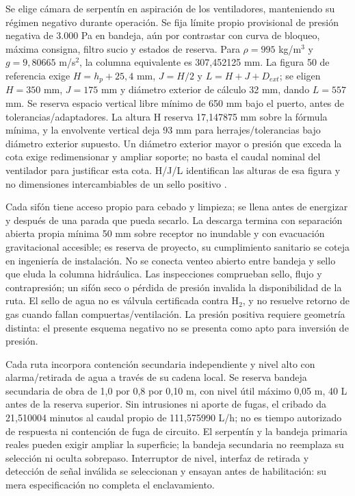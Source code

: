 Se elige cámara de serpentín en aspiración de los ventiladores, manteniendo su régimen negativo durante operación. Se fija límite propio provisional de presión negativa de 3.000 Pa en bandeja, aún por contrastar con curva de bloqueo, máxima consigna, filtro sucio y estados de reserva. Para $\rho=995$ kg/m$^3$ y $g=9,80665$ m/s$^2$, la columna equivalente es 307,452125 mm. La figura 50 de referencia exige $H=h_p+25,4$ mm, $J=H/2$ y $L=H+J+D_{ext}$; se eligen $H=350$ mm, $J=175$ mm y diámetro exterior de cálculo 32 mm, dando $L=557$ mm. Se reserva espacio vertical libre mínimo de 650 mm bajo el puerto, antes de tolerancias/adaptadores. La altura H reserva 17,147875 mm sobre la fórmula mínima, y la envolvente vertical deja 93 mm para herrajes/tolerancias bajo diámetro exterior supuesto. Un diámetro exterior mayor o presión que exceda la cota exige redimensionar y ampliar soporte; no basta el caudal nominal del ventilador para justificar esta cota. H/J/L identifican las alturas de esa figura y no dimensiones intercambiables de un sello positivo \parencite[p.~55, fig.~50]{int37-trane-drenaje}.

Cada sifón tiene acceso propio para cebado y limpieza; se llena antes de energizar y después de una parada que pueda secarlo. La descarga termina con separación abierta propia mínima 50 mm sobre receptor no inundable y con evacuación gravitacional accesible; es reserva de proyecto, su cumplimiento sanitario se coteja en ingeniería de instalación. No se conecta venteo abierto entre bandeja y sello que eluda la columna hidráulica. Las inspecciones comprueban sello, flujo y contrapresión; un sifón seco o pérdida de presión invalida la disponibilidad de la ruta. El sello de agua no es válvula certificada contra H$_2$, y no resuelve retorno de gas cuando fallan compuertas/ventilación. La presión positiva requiere geometría distinta: el presente esquema negativo no se presenta como apto para inversión de presión.

Cada ruta incorpora contención secundaria independiente y nivel alto con alarma/retirada de agua a través de su cadena local. Se reserva bandeja secundaria de obra de 1,0 por 0,8 por 0,10 m, con nivel útil máximo 0,05 m, 40 L antes de la reserva superior. Sin intrusiones ni aporte de fugas, el cribado da 21,510004 minutos al caudal propio de 111,575990 L/h; no es tiempo autorizado de respuesta ni contención de fuga de circuito. El serpentín y la bandeja primaria reales pueden exigir ampliar la superficie; la bandeja secundaria no reemplaza su selección ni oculta sobrepaso. Interruptor de nivel, interfaz de retirada y detección de señal inválida se seleccionan y ensayan antes de habilitación: su mera especificación no completa el enclavamiento.


